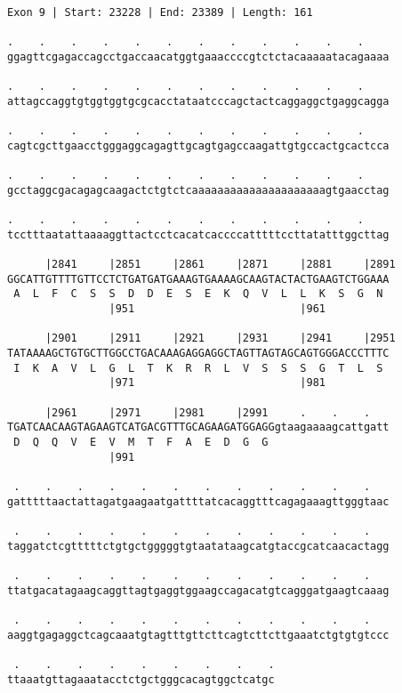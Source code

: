 \documentclass{article}
\begin{document}
\begin{Verbatim}
Exon 9 | Start: 23228 | End: 23389 | Length: 161
 
.    .    .    .    .    .    .    .    .    .    .    .    
ggagttcgagaccagcctgaccaacatggtgaaaccccgtctctacaaaaatacagaaaa
  
.    .    .    .    .    .    .    .    .    .    .    .    
attagccaggtgtggtggtgcgcacctataatcccagctactcaggaggctgaggcagga
  
.    .    .    .    .    .    .    .    .    .    .    .    
cagtcgcttgaacctgggaggcagagttgcagtgagccaagattgtgccactgcactcca
  
.    .    .    .    .    .    .    .    .    .    .    .    
gcctaggcgacagagcaagactctgtctcaaaaaaaaaaaaaaaaaaaaagtgaacctag
  
.    .    .    .    .    .    .    .    .    .    .    .    
tcctttaatattaaaaggttactcctcacatcaccccatttttccttatatttggcttag
  
      |2841     |2851     |2861     |2871     |2881     |2891
GGCATTGTTTTGTTCCTCTGATGATGAAAGTGAAAAGCAAGTACTACTGAAGTCTGGAAA
 A  L  F  C  S  S  D  D  E  S  E  K  Q  V  L  L  K  S  G  N 
                |951                          |961          
  
      |2901     |2911     |2921     |2931     |2941     |2951
TATAAAAGCTGTGCTTGGCCTGACAAAGAGGAGGCTAGTTAGTAGCAGTGGGACCCTTTC
 I  K  A  V  L  G  L  T  K  R  R  L  V  S  S  S  G  T  L  S 
                |971                          |981          
  
      |2961     |2971     |2981     |2991     .    .    .   
TGATCAACAAGTAGAAGTCATGACGTTTGCAGAAGATGGAGGgtaagaaaagcattgatt
 D  Q  Q  V  E  V  M  T  F  A  E  D  G  G                   
                |991                                        
  
 .    .    .    .    .    .    .    .    .    .    .    .   
gatttttaactattagatgaagaatgattttatcacaggtttcagagaaagttgggtaac
  
 .    .    .    .    .    .    .    .    .    .    .    .   
taggatctcgtttttctgtgctgggggtgtaatataagcatgtaccgcatcaacactagg
  
 .    .    .    .    .    .    .    .    .    .    .    .   
ttatgacatagaagcaggttagtgaggtggaagccagacatgtcagggatgaagtcaaag
  
 .    .    .    .    .    .    .    .    .    .    .    .   
aaggtgagaggctcagcaaatgtagtttgttcttcagtcttcttgaaatctgtgtgtccc
  
 .    .    .    .    .    .    .    .    .
ttaaatgttagaaatacctctgctgggcacagtggctcatgc
\end{Verbatim}
\end{document}

